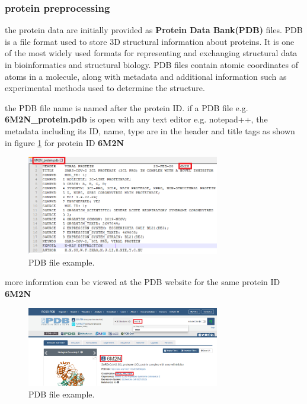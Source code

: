 \documentclass[11pt, a4paper]{article}
\begin{document}
        \subsubsection{protein preprocessing}
        the protein data are initially provided as \textbf{Protein Data Bank(PDB)} files. PDB is a file format used to store 3D structural information about proteins. It is one of the most widely used formats for representing and exchanging structural data in bioinformatics and structural biology.
        PDB files contain atomic coordinates of atoms in a molecule, along with metadata and additional information such as experimental methods used to determine the structure.

        the PDB file name is named after the protein ID. if a PDB file e.g. \textbf{6M2N\_protein.pdb}  is open with any text editor e.g. notepad++, the metadata including its ID, name, type
        are in the header and title tags as shown in figure \ref{fig 2} for protein ID \textbf{6M2N} 

            \begin{figure}[H]
                \centering
                \includegraphics[width=0.75\textwidth]{pdb file.png} %
                \caption{PDB file example.}
                \label{fig 2}
            \end{figure}

        more informtion can be viewed at the PDB website \cite{4} for the same protein ID \textbf{6M2N}
            \begin{figure}[H]
                \centering
                \includegraphics[width=0.75\textwidth]{pdb website.PNG} %
                \caption{PDB file example.}
                \label{fig 3}
            \end{figure}
\end{document}
